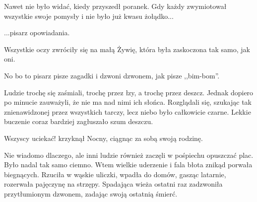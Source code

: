 Nawet nie było widać, kiedy przyszedł poranek.
Gdy każdy zwymiotował wszystkie swoje pomysły i nie było już kwasu żołądko...
\begin{dialogue}
	\ds{} ...pisarz opowiadania.
\end{dialogue}
Wszystkie oczy zwróciły się na małą Żywię, która była zaskoczona tak samo, jak oni.
\begin{dialogue}
	\ds{} No bo to pisarz pisze zagadki i dzwoni dzwonem, jak pisze ,,bim-bom''.
\end{dialogue}
Ludzie trochę się zaśmiali, trochę przez łzy, a trochę przez deszcz.
Jednak dopiero po minucie zauważyli, że nie ma nad nimi ich słońca.
Rozglądali się, szukając tak znienawidzonej przez wszystkich tarczy, lecz niebo było całkowicie czarne.
Lekkie buczenie coraz bardziej zagłuszało szum deszczu.
\begin{dialogue}
	\ds{} Wszyscy uciekać! \dm{} krzyknął Nocny, ciągnąc za sobą swoją rodzinę.
\end{dialogue}
Nie wiadomo dlaczego, ale inni ludzie również zaczęli w pośpiechu opuszczać plac.
Było nadal tak samo ciemno.
Wtem wielkie uderzenie i fala błota znikąd porwała biegnących.
Rzuciła w wąskie uliczki, wpadła do domów, gasząc latarnie, rozerwała pajęczynę na strzępy.
Spadająca wieża ostatni raz zadzwoniła przytłumionym dzwonem, zadając swoją ostatnią śmierć.


















